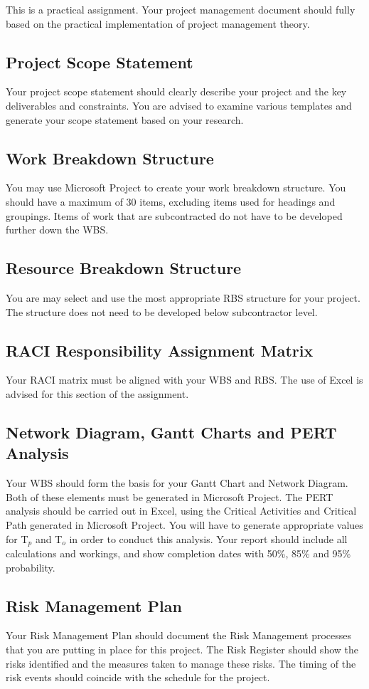 This is a practical assignment. Your project management document should fully based on the practical implementation of project management theory.\\

\subsection{Project Scope Statement}\label{sect:Scope}
Your project scope statement should clearly describe your project and the key deliverables and constraints.  You are advised to examine various templates and generate your scope statement based on your research. 
\subsection{Work Breakdown Structure}
You may use Microsoft Project to create your work breakdown structure. You should have a maximum of 30 items, excluding items used for headings and groupings.  Items of work that are subcontracted do not have to be developed further down the WBS.
\subsection{Resource Breakdown Structure}
You are may select and use the most appropriate RBS structure for your project.  The structure does not need to be developed below subcontractor level.
\subsection{RACI Responsibility Assignment Matrix}
Your RACI matrix must be aligned with your WBS and RBS.  The use of Excel is advised for this section of the assignment. 
\subsection{Network Diagram, Gantt Charts and PERT Analysis}
Your WBS should form the basis for your Gantt Chart and Network Diagram.  Both of these elements must be generated in Microsoft Project.  The PERT analysis should be carried out in Excel, using the Critical Activities and Critical Path generated in Microsoft Project.  You will have to generate appropriate values for T$_{p}$ and T$_{o}$ in order to conduct this analysis.  Your report should include all calculations and workings, and show completion dates with 50\%, 85\% and 95\% probability.     


\subsection{Risk Management Plan}
Your Risk Management Plan should document the Risk Management processes that you are putting in place for this project.  The Risk Register should show the risks identified and the measures taken to manage these risks.  The timing of the risk events should coincide with the schedule for the project.


